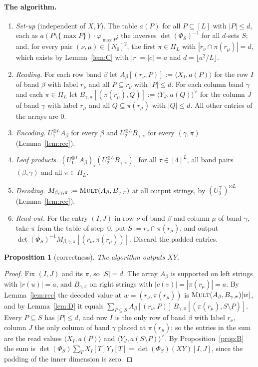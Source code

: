 \documentclass[11pt]{article}
\newtheorem{proposition}[theorem]{Proposition}
\theoremstyle{definition}
\theoremstyle{remark}
\newcommand{\Mult}{\textnormal{\textsc{Mult}}}
\newcommand{\Nz}{N_0}
\newcommand{\pairL}[2]{\langle #1,#2\rangle}
\newcommand{\pairR}[2]{\langle #1,#2\rangle^{\vee}}
\begin{document}
\paragraph{The algorithm.}
\begin{enumerate}[label=\arabic*.,start=0,leftmargin=*]
\item \emph{Set-up} (independent of $X,Y$). The table $a(P)$ for all $P\subseteq[L]$ with $|P|\le d$, each as $a(P\setminus\{\max P\})\cdot\varphi_{\max P}$; the inverses $\det(\Phi_S)^{-1}$ for all $d$-sets $S$; and, for every pair $(\nu,\mu)\in[\Nz]^2$, the first $\pi\in\Pi_L$ with $|r_\nu\cap\pi(r_\mu)|=d$, which exists by Lemma~\ref{lem:C} with $|r|=|c|=a$ and $d=\lfloor a^2/L\rfloor$.
\item \emph{Reading.} For each row band $\beta$ let $A_\beta[(r_\nu,P)]:=\pairL{X_I}{a(P)}$ for the row $I$ of band $\beta$ with label $r_\nu$ and all $P\subseteq r_\nu$ with $|P|\le d$. For each column band $\gamma$ and each $\pi\in\Pi_L$ let $B_{\gamma,\pi}[(\pi(r_\mu),Q)]:=\pairR{Y_J}{a(Q)}$ for the column $J$ of band $\gamma$ with label $r_\mu$ and all $Q\subseteq\pi(r_\mu)$ with $|Q|\le d$. All other entries of the arrays are $0$.
\item \emph{Encoding.} $U_1^{\otimes L}A_\beta$ for every $\beta$ and $U_2^{\otimes L}B_{\gamma,\pi}$ for every $(\gamma,\pi)$ (Lemma~\ref{lem:rec}).
\item \emph{Leaf products.} $(U_1^{\otimes L}A_\beta)_\tau(U_2^{\otimes L}B_{\gamma,\pi})_\tau$ for all $\tau\in[4]^L$, all band pairs $(\beta,\gamma)$ and all $\pi\in\Pi_L$.
\item \emph{Decoding.} $M_{\beta,\gamma,\pi}:=\Mult(A_\beta,B_{\gamma,\pi})$ at all output strings, by $(U_3^\top)^{\otimes L}$ (Lemma~\ref{lem:rec}).
\item \emph{Read-out.} For the entry $(I,J)$ in row $\nu$ of band $\beta$ and column $\mu$ of band $\gamma$, take $\pi$ from the table of step~0, put $S:=r_\nu\cap\pi(r_\mu)$, and output $\det(\Phi_S)^{-1}M_{\beta,\gamma,\pi}[(r_\nu,\pi(r_\mu))]$. Discard the padded entries.
\end{enumerate}

\begin{proposition}[correctness]\label{prop:correct}
The algorithm outputs $XY$.
\end{proposition}

\begin{proof}
Fix $(I,J)$ and its $\pi$, so $|S|=d$. The array $A_\beta$ is supported on left strings with $|r(u)|=a$, and $B_{\gamma,\pi}$ on right strings with $|c(v)|=|\pi(r_\mu)|=a$. By Lemma~\ref{lem:rec} the decoded value at $w=(r_\nu,\pi(r_\mu))$ is $\Mult(A_\beta,B_{\gamma,\pi})[w]$, and by Lemma~\ref{lem:D} it equals $\sum_{P\subseteq S}A_\beta[(r_\nu,P)]\,B_{\gamma,\pi}[(\pi(r_\mu),S\setminus P)]$. Every $P\subseteq S$ has $|P|\le d$, and row $I$ is the only row of band $\beta$ with label $r_\nu$, column $J$ the only column of band $\gamma$ placed at $\pi(r_\mu)$; so the entries in the sum are the read values $\pairL{X_I}{a(P)}$ and $\pairR{Y_J}{a(S\setminus P)}$. By Proposition~\ref{prop:B} the sum is $\det(\Phi_S)\sum_TX_I[T]Y_J[T]=\det(\Phi_S)(XY)[I,J]$, since the padding of the inner dimension is zero.
\end{proof}
\end{document}
